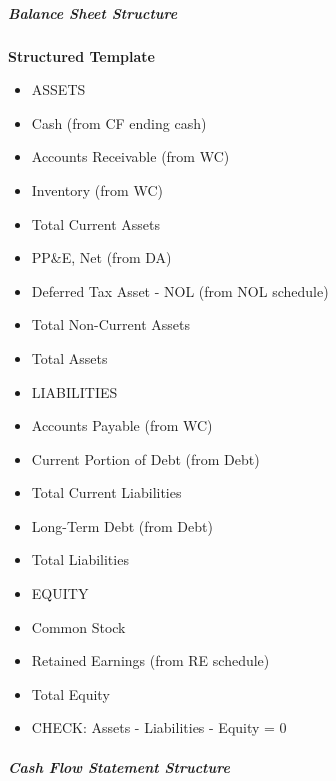 \documentclass[11pt]{article}
\begin{document}
\subparagraph{Balance Sheet Structure}\mbox{}\par

\textbf{Structured Template}
\begin{itemize}[leftmargin=*,itemsep=2pt,topsep=2pt]
\item {} ASSETS
\item {} Cash (from CF ending cash)
\item {} Accounts Receivable (from WC)
\item {} Inventory (from WC)
\item {} Total Current Assets
\item {} PP\&E, Net (from DA)
\item {} Deferred Tax Asset - NOL (from NOL schedule)
\item {} Total Non-Current Assets
\item {} Total Assets
\item {} LIABILITIES
\item {} Accounts Payable (from WC)
\item {} Current Portion of Debt (from Debt)
\item {} Total Current Liabilities
\item {} Long-Term Debt (from Debt)
\item {} Total Liabilities
\item {} EQUITY
\item {} Common Stock
\item {} Retained Earnings (from RE schedule)
\item {} Total Equity
\item {} CHECK: Assets - Liabilities - Equity = 0
\end{itemize}

\subparagraph{Cash Flow Statement Structure}\mbox{}\par
\end{document}
